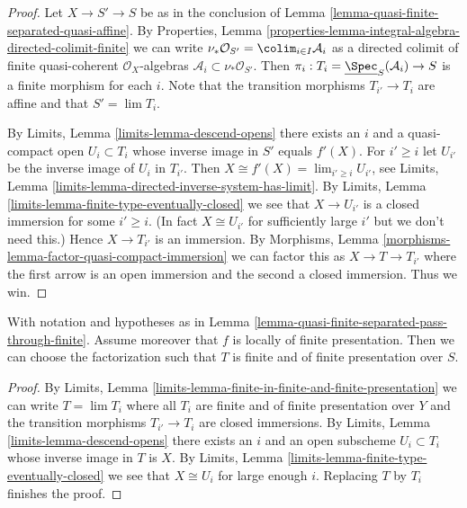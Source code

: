 \begin{proof}
Let $X \to S' \to S$ be as in the conclusion of
Lemma \ref{lemma-quasi-finite-separated-quasi-affine}.
By
Properties, Lemma
\ref{properties-lemma-integral-algebra-directed-colimit-finite}
we can write
$\nu_*\mathcal{O}_{S'} = \colim_{i \in I} \mathcal{A}_i$ as a
directed colimit of finite quasi-coherent $\mathcal{O}_X$-algebras
$\mathcal{A}_i \subset \nu_*\mathcal{O}_{S'}$. Then
$\pi_i : T_i = \underline{\Spec}_S(\mathcal{A}_i) \to S$
is a finite morphism for each $i$.
Note that the transition morphisms $T_{i'} \to T_i$ are affine
and that $S' = \lim T_i$.

\medskip\noindent
By Limits, Lemma \ref{limits-lemma-descend-opens}
there exists an $i$ and a quasi-compact open
$U_i \subset T_i$ whose inverse image in $S'$ equals
$f'(X)$. For $i' \geq i$ let $U_{i'}$ be the inverse image
of $U_i$ in $T_{i'}$. Then $X \cong f'(X) = \lim_{i' \geq i} U_{i'}$, see
Limits, Lemma \ref{limits-lemma-directed-inverse-system-has-limit}.
By Limits, Lemma \ref{limits-lemma-finite-type-eventually-closed} we see that
$X \to U_{i'}$ is a closed immersion for some $i' \geq i$.
(In fact $X \cong U_{i'}$ for sufficiently
large $i'$ but we don't need this.) Hence $X \to T_{i'}$ is an immersion. By
Morphisms, Lemma \ref{morphisms-lemma-factor-quasi-compact-immersion}
we can factor this as $X \to T \to T_{i'}$ where the first arrow
is an open immersion and the second a closed immersion. Thus we win.
\end{proof}

\begin{lemma}
\label{lemma-quasi-finite-separated-pass-through-finite-addendum}
With notation and hypotheses as in
Lemma \ref{lemma-quasi-finite-separated-pass-through-finite}.
Assume moreover that $f$ is locally of finite presentation. Then we can
choose the factorization such that $T$ is finite and of
finite presentation over $S$.
\end{lemma}

\begin{proof}
By Limits, Lemma
\ref{limits-lemma-finite-in-finite-and-finite-presentation} we can write
$T = \lim T_i$ where all $T_i$ are finite and of finite presentation
over $Y$ and the transition morphisms $T_{i'} \to T_i$ are closed
immersions. By
Limits, Lemma \ref{limits-lemma-descend-opens}
there exists an $i$ and an open subscheme $U_i \subset T_i$ whose inverse
image in $T$ is $X$. By
Limits, Lemma
\ref{limits-lemma-finite-type-eventually-closed}
we see that $X \cong U_i$ for large enough $i$.
Replacing $T$ by $T_i$ finishes the proof.
\end{proof}









